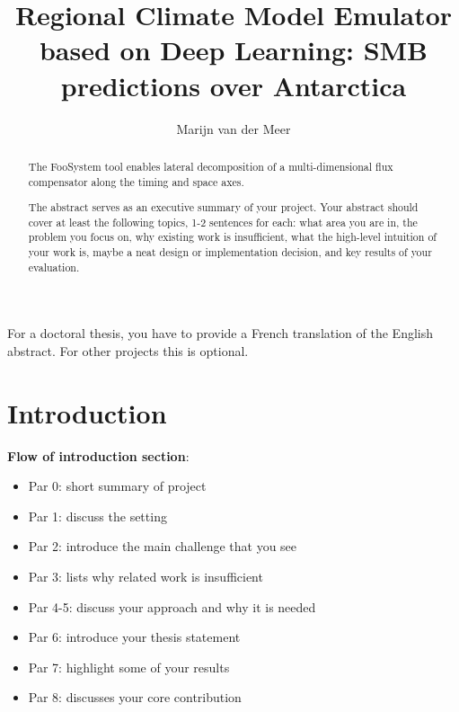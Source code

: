 \documentclass[a4paper,11pt,oneside]{report}
\title{Regional Climate Model Emulator based on Deep Learning: SMB predictions over Antarctica}
\author{Marijn van der Meer}
\newcommand{\sysname}{FooSystem\xspace}
\begin{document}
\maketitle
\makededication
\makeacks

\begin{abstract}
The \sysname tool enables lateral decomposition of a multi-dimensional
flux compensator along the timing and space axes.

The abstract serves as an executive summary of your project.
Your abstract should cover at least the following topics, 1-2 sentences for
each: what area you are in, the problem you focus on, why existing work is
insufficient, what the high-level intuition of your work is, maybe a neat
design or implementation decision, and key results of your evaluation.
\end{abstract}

\begin{frenchabstract}
For a doctoral thesis, you have to provide a French translation of the
English abstract. For other projects this is optional.
\end{frenchabstract}

\maketoc

\chapter{Introduction}

\textbf{Flow of introduction section}:
\begin{itemize}
    \item Par 0: short summary of project
    \item Par 1: discuss the setting
    \item Par 2: introduce the main challenge that you see
    \item Par 3: lists why related work is insufficient
    \item Par 4-5: discuss your approach and why it is needed
    \item Par 6: introduce your thesis statement
    \item Par 7: highlight some of your results
    \item Par 8: discusses your core contribution
\end{itemize}
 
\end{document}

